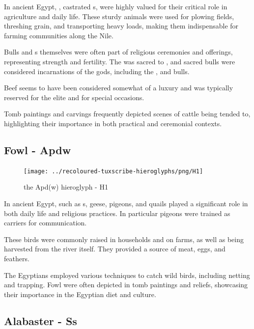 In ancient Egypt, , castrated s, were highly valued for their critical role in agriculture and daily life. These sturdy animals were used for plowing fields, threshing grain, and transporting heavy loads, making them indispensable for farming communities along the Nile.

Bulls and s themselves were often part of religious ceremonies and offerings, representing strength and fertility. The  was sacred to , and sacred bulls were considered incarnations of the gods, including the ,  and  bulls.

Beef seems to have been considered somewhat of a luxury and was typically reserved for the elite and for special occasions.

Tomb paintings and carvings frequently depicted scenes of cattle being tended to, highlighting their importance in both practical and ceremonial contexts.

\subsection*{Fowl - Apdw}

\begin{figure} [H]
	\centering
	\texttt{[image: ../recoloured-tuxscribe-hieroglyphs/png/H1]}
	\caption{the Apd(w) hieroglyph - H1}
\end{figure}

In ancient Egypt,  such as s, geese, pigeons, and quails played a significant role in both daily life and religious practices. In particular pigeons were trained as carriers for communication.

These birds were commonly raised in households and on farms, as well as being harvested from the river itself. They provided a source of meat, eggs, and feathers.

The Egyptians employed various techniques to catch wild birds, including netting and trapping. Fowl were often depicted in tomb paintings and reliefs, showcasing their importance in the Egyptian diet and culture.

\subsection*{Alabaster - Ss}

